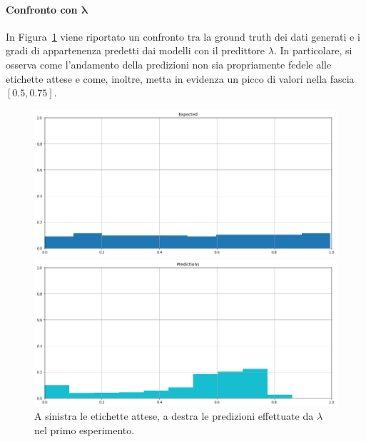 \documentclass[12pt]{report}
\theoremstyle{definition}
\begin{document}
\paragraph{Confronto con $\bm{\lambda}$}
In Figura~\ref{prediction_exp1} viene riportato un confronto tra la ground truth dei dati generati e i gradi di appartenenza predetti dai modelli con il predittore $\lambda$. In particolare, si osserva come l'andamento della predizioni non sia propriamente fedele alle etichette attese e come, inoltre, metta in evidenza un picco di valori nella fascia $[0.5, 0.75]$.
\begin{figure}
\centering
    \begin{minipage}{0.48\textwidth}
        \includegraphics[width=\linewidth]{images/experiment_uniform_disgiunti/expected_memberships.png}
    \end{minipage}
    \begin{minipage}{0.48\textwidth}
        \includegraphics[width=\linewidth]{images/experiment_uniform_disgiunti/prediction_memberships.png}
    \end{minipage}
    \caption{A sinistra le etichette attese, a destra le predizioni effettuate da $\lambda$ nel primo esperimento.}
    \label{prediction_exp1}
\end{figure} 
\end{document}
